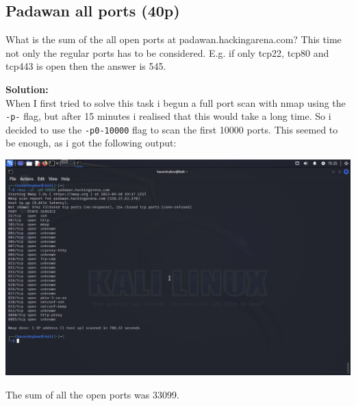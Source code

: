 \subsection{Padawan all ports (40p)}
What is the sum of the all open ports at padawan.hackingarena.com? This time not only the regular ports has to be considered. E.g. if only tcp22, tcp80 and tcp443 is open then the answer is 545.

\textbf{Solution:}\\
When I first tried to solve this task i begun a full port scan with nmap using the \texttt{-p-} flag, but after 15 minutes i realised that this would take a long time. So i decided to use the \texttt{-p0-10000} flag to scan the first 10000 ports. This seemed to be enough, as i got the following output:

\includegraphics[width=15cm]{img/Network mapping/Padawan all ports/Skjermbilde 2023-09-10 kl. 19.35.19.png}

The sum of all the open ports was 33099.